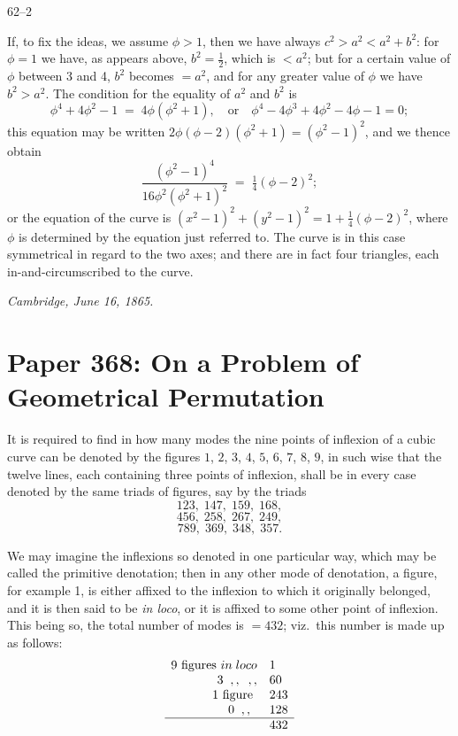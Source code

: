 \documentclass[11pt]{article}
\begin{document}
\hfill 62--2

\newpage

\noindent If, to fix the ideas, we assume $\phi > 1$, then we have always $c^{2} > a^{2} < a^{2} + b^{2}$: for $\phi = 1$ we have, as appears above, $b^{2} = \tfrac{1}{2}$, which is $< a^{2}$; but for a certain value of $\phi$ between 3 and 4, $b^{2}$ becomes $=a^{2}$, and for any greater value of $\phi$ we have $b^{2} > a^{2}$. The condition for the equality of $a^{2}$ and $b^{2}$ is
\[
\phi^{4} + 4\phi^{2} - 1 \;=\; 4\phi(\phi^{2} + 1),\quad\text{or}\quad \phi^{4} - 4\phi^{3} + 4\phi^{2} - 4\phi - 1 = 0;
\]
this equation may be written $2\phi(\phi - 2)(\phi^{2} + 1) = (\phi^{2} - 1)^{2}$, and we thence obtain
\[
\frac{(\phi^{2} - 1)^{4}}{16\phi^{2}(\phi^{2} + 1)^{2}} \;=\; \tfrac{1}{4}(\phi - 2)^{2};
\]
or the equation of the curve is $(x^{2} - 1)^{2} + (y^{2} - 1)^{2} = 1 + \tfrac{1}{4}(\phi - 2)^{2}$, where $\phi$ is determined by the equation just referred to. The curve is in this case symmetrical in regard to the two axes; and there are in fact four triangles, each in-and-circumscribed to the curve.

\medskip
\noindent\textit{Cambridge, June 16, 1865.}

\bigskip

\section*{Paper 368: On a Problem of Geometrical Permutation}

\medskip{}

\medskip
It is required to find in how many modes the nine points of inflexion of a cubic curve can be denoted by the figures $1$, $2$, $3$, $4$, $5$, $6$, $7$, $8$, $9$, in such wise that the twelve lines, each containing three points of inflexion, shall be in every case denoted by the same triads of figures, say by the triads
\[
123,\; 147,\; 159,\; 168,
\]
\[
456,\; 258,\; 267,\; 249,
\]
\[
789,\; 369,\; 348,\; 357.
\]

We may imagine the inflexions so denoted in one particular way, which may be called the primitive denotation; then in any other mode of denotation, a figure, for example 1, is either affixed to the inflexion to which it originally belonged, and it is then said to be \emph{in loco}, or it is affixed to some other point of inflexion. This being so, the total number of modes is $=432$; viz.\ this number is made up as follows:
\[
\begin{array}{rl}
9 \text{ figures } in\;loco & 1\\
3 \;\; ,, \;\; ,, & 60\\
1 \text{ figure } & 243\\
0 \;\; ,, \;\; & 128\\\hline
& 432
\end{array}
\]
\end{document}

